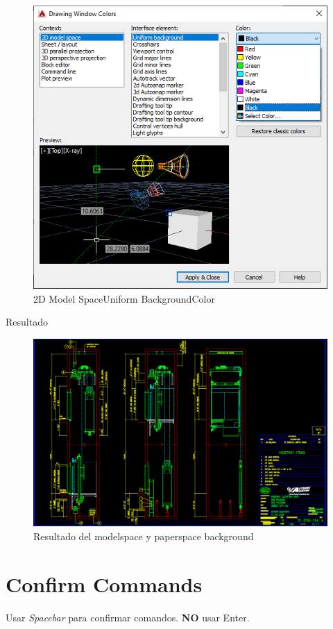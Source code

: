 \documentclass[12pt,letterpaper,final]{report}
\begin{document}
\begin{figure}[H]
	\centering
	\includegraphics[width=0.65\linewidth, height=0.45\textheight,keepaspectratio]{Imagenes/autocad_background_03}
	\caption{2D Model Space\textrightarrow Uniform Background\textrightarrow Color}
	\label{fig:autocadbackground03}
\end{figure}

\clearpage

{\LARGE Resultado}

\begin{figure}[H]
	\centering
	\includegraphics[width=0.85\linewidth, height=0.75\textheight,keepaspectratio]{Imagenes/autocad_background_04}
	\caption{Resultado del modelspace y paperspace background}
	\label{fig:autocadbackground04}
\end{figure}

\chapter{Confirm Commands}

Usar \emph{Spacebar} para confirmar comandos. \textbf{NO} usar Enter.
\end{document}
